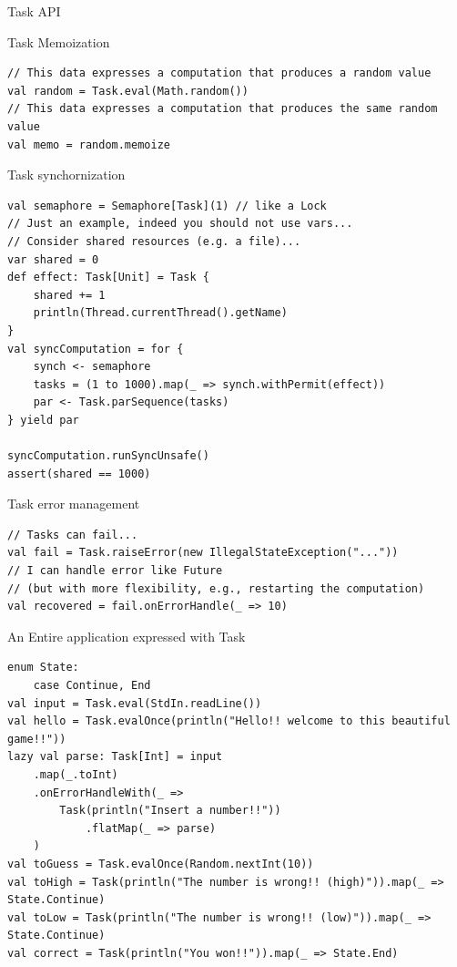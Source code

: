 \documentclass[presentation, 9pt]{beamer}\mode<presentation>{\usetheme{AMSBolognaFC}}
\begin{document}
\begin{frame}{Task API}
\begin{alertblock}{Task Memoization}
\begin{tcolorbox}[left=0pt, top=0pt, bottom=0pt]
\begin{verbatim}
// This data expresses a computation that produces a random value
val random = Task.eval(Math.random())
// This data expresses a computation that produces the same random value
val memo = random.memoize
								 \end{verbatim}
							 \end{tcolorbox}
					 \end{alertblock}
					 \begin{alertblock}{Task synchornization}
						\begin{tcolorbox}[left=0pt, top=0pt, bottom=0pt]
									 \begin{verbatim}
val semaphore = Semaphore[Task](1) // like a Lock
// Just an example, indeed you should not use vars... 
// Consider shared resources (e.g. a file)...
var shared = 0 
def effect: Task[Unit] = Task {
	shared += 1
	println(Thread.currentThread().getName)
}
val syncComputation = for {
	synch <- semaphore
	tasks = (1 to 1000).map(_ => synch.withPermit(effect))
	par <- Task.parSequence(tasks)
} yield par

syncComputation.runSyncUnsafe()
assert(shared == 1000)
									 \end{verbatim}
								 \end{tcolorbox}
						 \end{alertblock}
\begin{alertblock}{Task error management}
	\begin{tcolorbox}[left=0pt, top=0pt, bottom=0pt]
										 \begin{verbatim}
// Tasks can fail...
val fail = Task.raiseError(new IllegalStateException("..."))
// I can handle error like Future 
// (but with more flexibility, e.g., restarting the computation)
val recovered = fail.onErrorHandle(_ => 10)
										 \end{verbatim}
									 \end{tcolorbox}
							 \end{alertblock}
\begin{alertblock}{An Entire application expressed with Task}
	\begin{tcolorbox}[left=0pt, top=0pt, bottom=0pt]
					\begin{verbatim}
enum State:
	case Continue, End
val input = Task.eval(StdIn.readLine())
val hello = Task.evalOnce(println("Hello!! welcome to this beautiful game!!"))
lazy val parse: Task[Int] = input
	.map(_.toInt)
	.onErrorHandleWith(_ =>
		Task(println("Insert a number!!"))
			.flatMap(_ => parse)
	)
val toGuess = Task.evalOnce(Random.nextInt(10))
val toHigh = Task(println("The number is wrong!! (high)")).map(_ => State.Continue)
val toLow = Task(println("The number is wrong!! (low)")).map(_ => State.Continue)
val correct = Task(println("You won!!")).map(_ => State.End)


\end{verbatim}
\end{tcolorbox}
\end{alertblock}
\end{frame}
\end{document}
